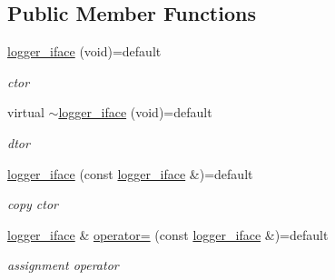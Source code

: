 \subsection*{Public Member Functions}
\begin{DoxyCompactItemize}
\item 
\mbox{\label{classcpp__redis_1_1logger__iface_a902e41bf0777b960b6575e7ac986147b}} 
\mbox{\hyperlink{classcpp__redis_1_1logger__iface_a902e41bf0777b960b6575e7ac986147b}{logger\+\_\+iface}} (void)=default
\begin{DoxyCompactList}\small\item\em ctor \end{DoxyCompactList}\item 
\mbox{\label{classcpp__redis_1_1logger__iface_ac7ed1b828afd2e6589fcdda167d34aa5}} 
virtual \mbox{\hyperlink{classcpp__redis_1_1logger__iface_ac7ed1b828afd2e6589fcdda167d34aa5}{$\sim$logger\+\_\+iface}} (void)=default
\begin{DoxyCompactList}\small\item\em dtor \end{DoxyCompactList}\item 
\mbox{\label{classcpp__redis_1_1logger__iface_a7f1cb271b18e40f2dde7e45028e69a84}} 
\mbox{\hyperlink{classcpp__redis_1_1logger__iface_a7f1cb271b18e40f2dde7e45028e69a84}{logger\+\_\+iface}} (const \mbox{\hyperlink{classcpp__redis_1_1logger__iface}{logger\+\_\+iface}} \&)=default
\begin{DoxyCompactList}\small\item\em copy ctor \end{DoxyCompactList}\item 
\mbox{\label{classcpp__redis_1_1logger__iface_a04324701cb81ba6a23f73025b0b3eee0}} 
\mbox{\hyperlink{classcpp__redis_1_1logger__iface}{logger\+\_\+iface}} \& \mbox{\hyperlink{classcpp__redis_1_1logger__iface_a04324701cb81ba6a23f73025b0b3eee0}{operator=}} (const \mbox{\hyperlink{classcpp__redis_1_1logger__iface}{logger\+\_\+iface}} \&)=default
\begin{DoxyCompactList}\small\item\em assignment operator \end{DoxyCompactList}\item 

\end{DoxyCompactItemize}
